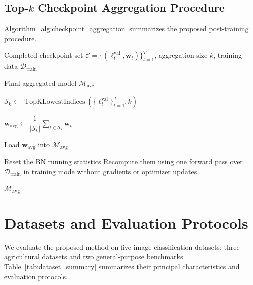 \documentclass[runningheads]{llncs}
\begin{document}
\subsection{Top-$k$ Checkpoint Aggregation Procedure}

Algorithm~\ref{alg:checkpoint_aggregation} summarizes the proposed
post-training procedure.

\begin{algorithm}[ht]
  \caption{Post-Training Top-$k$ Validation-Loss-Guided Checkpoint Aggregation}
  \label{alg:checkpoint_aggregation}
  \begin{algorithmic}[1]

    \Require Completed checkpoint set
    $\mathcal{C}
    =
    \{(\ell_t^{\mathrm{val}},\mathbf{w}_t)\}_{t=1}^{T}$,
    aggregation size $k$, training data $\mathcal{D}_{\mathrm{train}}$

    \Ensure Final aggregated model $\mathcal{M}_{\mathrm{avg}}$

    \State $\mathcal{S}_k \leftarrow
    \operatorname{TopKLowestIndices}
    \left(
      \{\ell_t^{\mathrm{val}}\}_{t=1}^{T},k
    \right)$

    \State $\mathbf{w}_{\mathrm{avg}} \leftarrow
    \dfrac{1}{|\mathcal{S}_k|}
    \displaystyle\sum_{t\in\mathcal{S}_k}\mathbf{w}_t$

    \State Load $\mathbf{w}_{\mathrm{avg}}$ into
    $\mathcal{M}_{\mathrm{avg}}$

    \State Reset the BN running statistics
    \State Recompute them using one forward pass over
    $\mathcal{D}_{\mathrm{train}}$ in training mode
    \Statex \hspace{\algorithmicindent}
    without gradients or optimizer updates
    \EndIf

    \State \Return $\mathcal{M}_{\mathrm{avg}}$

  \end{algorithmic}
\end{algorithm}
\FloatBarrier
\section{Datasets and Evaluation Protocols}
\label{sec:data_description}

We evaluate the proposed method on five image-classification datasets:
three agricultural datasets and two general-purpose benchmarks.
Table~\ref{tab:dataset_summary} summarizes their principal characteristics
and evaluation protocols.
\end{document}
